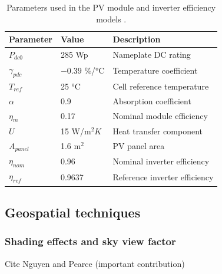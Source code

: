 \begin{table}[htbp]
\centering
\footnotesize
\caption{Parameters used in the PV module and inverter efficiency models \cite{dobos_pvwatts_2014, faiman_assessing_2008}.}
\label{tab:efficiency}

    \begin{tabular}{lll}
    \hline
    \textbf{Parameter} & \textbf{Value}     & \textbf{Description}          \\ \hline
    $P_{dc0}$          & 285 Wp           & Nameplate DC rating           \\
    $\gamma_{pdc}$     & $-0.39$ \%/°C& Temperature coefficient       \\
    $T_{ref}$          & 25 °C       & Cell reference temperature    \\
    $\alpha$           & 0.9                & Absorption coefficient        \\
    $\eta_m$           & 0.17               & Nominal module efficiency     \\
    $U$                & 15 W/m$^2K$        & Heat transfer component       \\
    $A_\mathit{panel}$        & 1.6 m$^2$          & PV panel area                 \\
    $\eta_\mathit{nom}$       & 0.96               & Nominal inverter efficiency   \\
    $\eta_\mathit{ref}$       & 0.9637             & Reference inverter efficiency \\ \hline
    \end{tabular}
\end{table}

\subsection{Geospatial techniques}
\label{GIS_methods}

\subsubsection{Shading effects and sky view factor}

Cite Nguyen and Pearce (important contribution) 

